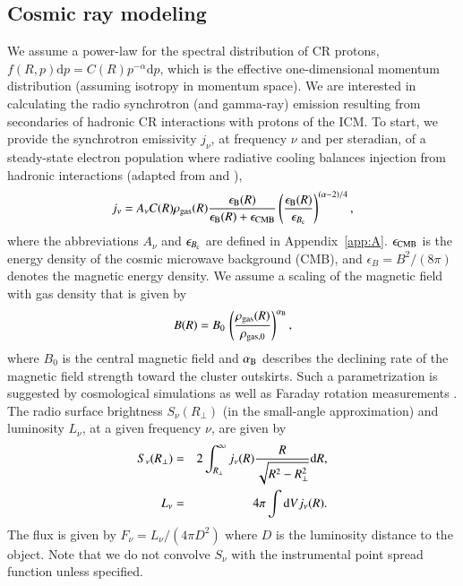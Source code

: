 \documentclass[useAMS,usenatbib]{mn2e}
\newcommand{\dd}{\mathrm{d}}
\begin{document}
\subsection{Cosmic ray modeling}
\label{sec:2.3}
We assume a power-law for the spectral distribution of CR protons, $f(R,p) \dd
p=C(R) p^{-\alpha} \dd p$, which is the effective one-dimensional momentum
distribution (assuming isotropy in momentum space). We are interested in
calculating the radio synchrotron (and gamma-ray) emission resulting from
secondaries of hadronic CR interactions with protons of the ICM. To start, we
provide the synchrotron emissivity $j_{\nu}$, at frequency $\nu$ and per
steradian, of a steady-state electron population where radiative cooling
balances injection from hadronic interactions (adapted from
\citealp{2008MNRAS.385.1211P} and \citealp{2011A&A...527A..99E}),
\begin{equation}
j_{\nu}  =  A_\nu C(R) \rho_{{\mathrm{gas}}}(R) 
\frac{\epsilon_{{\mathrm{B}}}(R)}{\epsilon_{{\mathrm{B}}}(R)+\epsilon_{{\mathrm{CMB}}}} 
\left( \frac{\epsilon_{{\mathrm{B}}}(R)}{\epsilon_{B_{{\mathrm{c}}}}} \right)^{(\alpha-2)/4},
\label{eq:jnu}
\end{equation}
where the abbreviations $A_\nu$ and $\epsilon_{B_{{\mathrm{c}}}}$ are defined in
Appendix~\ref{app:A}. $\epsilon_{{\mathrm{CMB}}}$ is the energy density of the cosmic
microwave background (CMB), and $\epsilon_B=B^{2}/(8\pi)$ denotes the magnetic
energy density. We assume a scaling of the magnetic field with gas density that
is given by
\begin{equation}
B(R) = B_0\,\left(\frac{\rho_{{\mathrm{gas}}}(R)}{\rho_{{\mathrm{gas}},0}}\right)^{ \alpha_{{\mathrm{B}}}},
\label{eq:B}
\end{equation}
where $B_0$ is the central magnetic field and $\alpha_{{\mathrm{B}}}$ describes the
declining rate of the magnetic field strength toward the cluster outskirts. Such
a parametrization is suggested by cosmological simulations
\citep{2008A&A...482L..13D} as well as Faraday rotation measurements \citep[][and
references therein]{2010A&A...513A..30B, 2011A&A...529A..13K}.  The radio
surface brightness $S_{\nu}(R_{\perp})$ (in the small-angle approximation) and
luminosity $L_{\nu}$, at a given frequency $\nu$, are given by
\begin{eqnarray}
S_\nu(R_{\perp}) &=& 2 \int_{R_{\perp}}^{\infty} j_{\nu}(R) \frac{R}{\sqrt{R^{2}-R_{\perp}^{2}}} \rmn{d}R, \label{eq:surf} \\
L_{\nu}  &=&  4 \pi \int \dd V j_\nu(R).
\label{eq:lum}
\end{eqnarray}
The flux is given by $F_{\nu}=L_{\nu}/(4\pi D^{2})$ where $D$ is the luminosity
distance to the object. Note that we do not convolve $S_\nu$ with the instrumental
point spread function unless specified.
\end{document}
